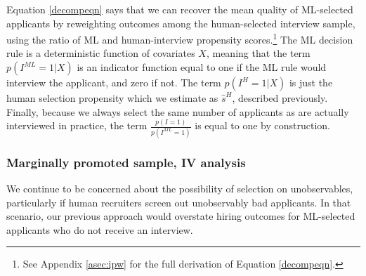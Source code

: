 \documentclass[crop,noquery,editorname,historyrev,nosurname,runningno,sepcount]{RESTUD}
\begin{document}
Equation \eqref{decompeqn} says that we can recover the mean quality of ML-selected applicants by reweighting outcomes among the human-selected interview sample, using the ratio of ML and human-interview propensity scores.\footnote{See Appendix \ref{asec:ipw} for the full derivation of Equation \eqref{decompeqn}.}  The ML decision rule is a deterministic function of covariates $X$, meaning that the term $p(I^{ML}=1 | X)$ is an indicator function equal to one if the ML rule would interview the applicant, and zero if not.  The term $p(I^{H}=1 | X)$ is just the human selection propensity which we estimate as $\hat{s}^H$, described previously.  Finally, because we always select the same number of applicants as are actually interviewed in practice, the term $\frac{p(I=1)}{p(I^{ML}=1)}$ is equal to one by construction.  


\begin{table}
\end{table} 

\subsubsection{Marginally promoted sample, IV analysis} \label{sec:iv}

We continue to be concerned about the possibility of selection on unobservables, particularly if human recruiters screen out unobservably bad applicants.  In that scenario, our previous approach would overstate hiring outcomes for ML-selected applicants who do not receive an interview. 
\end{document}
